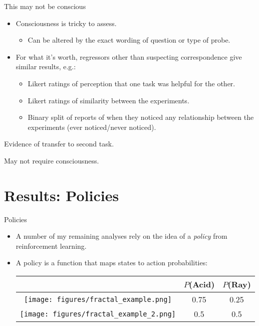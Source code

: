 \documentclass{beamer}
\begin{document}
\begin{frame}{This may not be conscious}
\begin{itemize}
\item Consciousness is tricky to assess.
    \begin{itemize}
    \item<2-> Can be altered by the exact wording of question or type of probe.
    \end{itemize}
\item<3-> For what it's worth, regressors other than suspecting correspondence give similar results, e.g.:
    \begin{itemize}
    \item<4-> Likert ratings of perception that one task was helpful for the other. 
    \item<5-> Likert ratings of similarity between the experiments.
    \item<6-> Binary split of reports of when they noticed any relationship between the experiments (ever noticed/never noticed).
    \end{itemize}
\end{itemize}
\end{frame}

\begin{frame}[standout]
Evidence of transfer to second task. \par
{} {
May not require consciousness.
}
\end{frame}

\section{Results: Policies}

\begin{frame}{Policies}
\begin{itemize}
\item A number of my remaining analyses rely on the idea of a \emph{policy} from reinforcement learning.
\item<2-> A policy is a function that maps states to action probabilities:
\begin{center}
\begin{table}

\begin{tabular}{|c|c|c|}
\hline 
& \(P\)(Acid) & \(P\)(Ray) \\
\hline
\texttt{[image: figures/fractal\_example.png]} & 0.75 & 0.25\\ \hline
\texttt{[image: figures/fractal\_example\_2.png]} & 0.5 & 0.5 \\ \hline
\end{tabular}
\end{table}
\end{center}
\end{itemize}
\end{frame}
\end{document}
